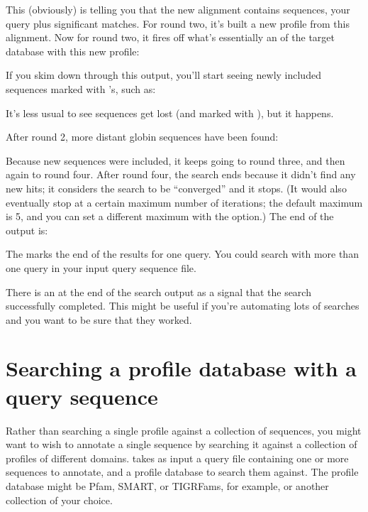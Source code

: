 
This (obviously) is telling you that the new alignment contains \JHUninc{}
sequences, your query plus \JHUnsig{} significant matches. For round two,
it's built a new profile from this alignment. Now for round two, it
fires off what's essentially an  of the target
database with this new profile:


If you skim down through this output, you'll start seeing newly
included sequences marked with \mono{+}'s, such as:


It's less usual to see sequences get lost (and marked with \mono{-}),
but it happens.

After round 2, more distant globin sequences have been found:


Because new sequences were included, it keeps going to round three,
and then again to round four. After round four, the search ends
because it didn't find any new hits; it considers the search to be
``converged'' and it stops. (It would also eventually stop at a
certain maximum number of iterations; the default maximum is 5, and
you can set a different maximum with the  option.)  The end
of the output is:


The \mono{//} marks the end of the results for one query. You could
search with more than one query in your input query sequence
file. 

There is an \mono{[ok]} at the end of the search output as a signal
that the search successfully completed. This might be useful if you're
automating lots of searches and you want to be sure that they worked.



\section{Searching a profile database with a query sequence}

Rather than searching a single profile against a collection of
sequences, you might want to wish to annotate a single sequence by
searching it against a collection of profiles of different domains.
 takes as input a query file containing one or more
sequences to annotate, and a profile database to search them against.
The profile database might be Pfam, SMART, or TIGRFams, for example, or
another collection of your choice. 

